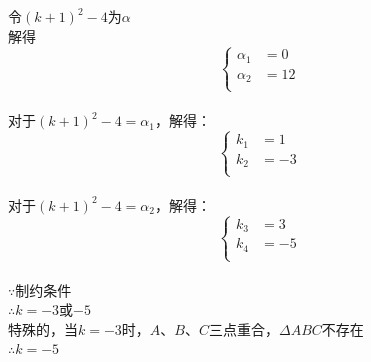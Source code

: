 \documentclass[12pt]{article}
\begin{document}
			令$(k+1)^{2}-4$为$\alpha{}$\\
			解得\begin{equation}
				\left\{
					\begin{aligned}
						\alpha{}_{1}&=0\\
						\alpha{}_{2}&=12\\
					\end{aligned}
				\right.
			\end{equation}\\
			对于$(k+1)^{2}-4=\alpha{}_{1}$，解得：\begin{equation}
				\left\{
					\begin{aligned}
						k_{1}&=1\\
						k_{2}&=-3\\
					\end{aligned}
				\right.
			\end{equation}\\
			对于$(k+1)^{2}-4=\alpha{}_{2}$，解得：\begin{equation}
				\left\{
					\begin{aligned}
						k_{3}&=3\\
						k_{4}&=-5\\
					\end{aligned}
				\right.
			\end{equation}\\
			$\because{}$制约条件\\
			$\therefore{}k=-3$或$-5$\\
			特殊的，当$k=-3$时，$A$、$B$、$C$三点重合，$\Delta{}ABC$不存在\\
			$\therefore{}k=-5$
\end{document}
